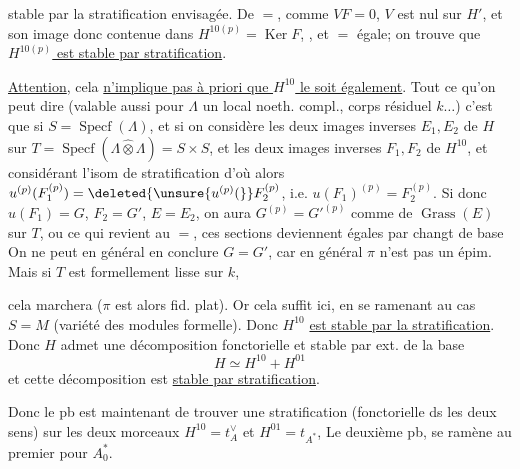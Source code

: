 stable par la stratification envisagée. De $=$, comme $VF=0$, $V$ est nul sur $H'$, et son image donc contenue dans $H^{10(p)}=\operatorname{Ker}F$, , et $=$ égale; on trouve que \uline{$H^{10(p)}$ est stable par  stratification}. 

\uline{Attention}, cela \uline{n'implique pas à priori que $H^{10}$ le soit également}. Tout ce qu'on peut dire (valable aussi pour $\Lambda$ un  local noeth. compl., corps résiduel $k\ldots$) c'est que si $S=\operatorname{Specf}(\Lambda)$, et si on considère les deux images inverses $E_1,E_2$ de $H$ sur  $T=\operatorname{Specf}(\Lambda\widehat\otimes\Lambda)=S\times S$,  et les deux images inverses $F_1,F_2$ de $H^{10}$, et considérant l'isom de stratification
d'où
alors $u^{(p)}(F_1^{(p)})=\deleted{\unsure{u^{(p)}(}}F_2^{(p)}$, i.e. $u(F_1)^{(p)}=F_2^{(p)}$. Si donc $u(F_1)=G$, $F_2=G'$, $E=E_2$, on aura $G^{(p)}=G'^{(p)}$ comme  de $\operatorname{Grass}(E)$ sur $T$, ou ce qui revient au $=$, ces sections deviennent égales par changt de base
On ne peut en général en conclure $G=G'$, car en général $\pi$ n'est pas un épim. Mais si  $T$ est formellement lisse sur $k$,

cela marchera ($\pi$ est alors fid. plat). Or cela suffit ici, en se ramenant au cas $S=M$ (variété des modules formelle). Donc $H^{10}$ \uline{est stable par la stratification}. Donc $H$ admet une décomposition fonctorielle et stable par ext. de la base
\[
H\simeq H^{10}+H^{01}
\]
et cette décomposition est \uline{stable par stratification}.

Donc le pb est maintenant de trouver une stratification  (fonctorielle ds les deux sens) sur les deux morceaux $H^{10}=t_A^\vee$ et $H^{01}=t_{A^*}$, Le deuxième pb,  se ramène au premier pour $A_0^*$.

